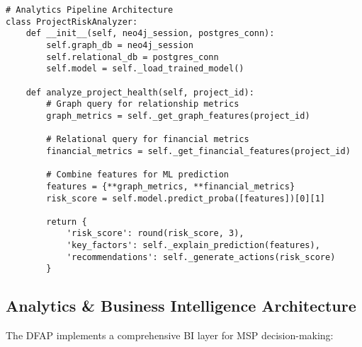 \begin{verbatim}
# Analytics Pipeline Architecture
class ProjectRiskAnalyzer:
    def __init__(self, neo4j_session, postgres_conn):
        self.graph_db = neo4j_session
        self.relational_db = postgres_conn
        self.model = self._load_trained_model()
    
    def analyze_project_health(self, project_id):
        # Graph query for relationship metrics
        graph_metrics = self._get_graph_features(project_id)
        
        # Relational query for financial metrics  
        financial_metrics = self._get_financial_features(project_id)
        
        # Combine features for ML prediction
        features = {**graph_metrics, **financial_metrics}
        risk_score = self.model.predict_proba([features])[0][1]
        
        return {
            'risk_score': round(risk_score, 3),
            'key_factors': self._explain_prediction(features),
            'recommendations': self._generate_actions(risk_score)
        }
\end{verbatim}

\subsection{Analytics \& Business Intelligence Architecture}

The DFAP implements a comprehensive BI layer for MSP decision-making:

